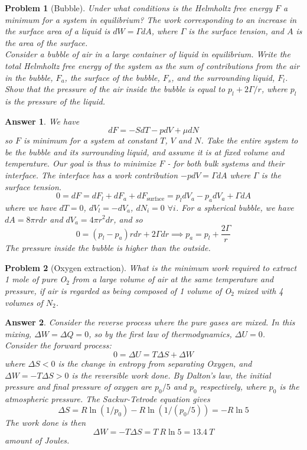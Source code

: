 \documentclass[a4paper]{article}
\newtheorem{ans}{Answer}[section]
\theoremstyle{new}
\newtheorem{qns}{Problem}[section]
\begin{document}
\newpage
\begin{qns}[Bubble]
Under what conditions is the Helmholtz free energy $F$ a minimum for a system in equilibrium? The work corresponding to an increase in the surface area of a liquid is $dW = \Gamma dA$, where $\Gamma$ is the surface tension, and $A$ is the area of the surface.\\[5pt]
Consider a bubble of air in a large container of liquid in equilibrium. Write the total Helmholtz free energy of the system as the sum of contributions from the air in the bubble, $F_a$, the surface of the bubble, $F_s$, and the surrounding liquid, $F_l$. Show that the pressure of the air inside the bubble is equal to $p_l + 2\Gamma/r$, where $p_l$ is the pressure of the liquid.
\end{qns}
\begin{ans}
We have
$$dF=-SdT-pdV+\mu dN$$
so $F$ is minimum for a system at constant $T$, $V$ and $N$. Take the entire system to be the bubble and its surrounding liquid, and assume it is at fixed volume and temperature. Our goal is thus to minimize $F$ - for both bulk systems and their interface. The interface has a work contribution $-pdV=\Gamma dA$ where $\Gamma$ is the surface tension.
$$0=dF=dF_l+dF_a+dF_{\text{surface}}=p_ldV_a-p_adV_a+\Gamma dA$$
where we have $dT=0$, $dV_l=-dV_a$, $dN_i=0$ $\forall i$. For a spherical bubble, we have $dA=8\pi rdr$ and $dV_a=4\pi r^2dr$, and so
$$0=(p_l-p_a)rdr+2\Gamma dr\implies p_a=p_l+\frac{2\Gamma}{r}$$
The pressure inside the bubble is higher than the outside.
\end{ans}
\begin{qns}[Oxygen extraction]
What is the minimum work required to extract 1 mole of pure O$_2$ from a large volume of air at the same temperature and pressure, if air is regarded as being composed of 1 volume of O$_2$ mixed with 4 volumes of $N_2$. 
\end{qns}
\begin{ans}
Consider the reverse process where the pure gases are mixed. In this mixing, $\Delta W=\Delta Q=0$, so by the first law of thermodynamics, $\Delta U=0$.\\[5pt]
Consider the forward process:
$$0=\Delta U=T\Delta S+\Delta W$$
where $\Delta S<0$ is the change in entropy from separating Oxygen, and $\Delta W=-T\Delta S>0$ is the reversible work done. By Dalton's law, the initial pressure and final pressure of oxygen are $p_0/5$ and $p_0$ respectively, where $p_0$ is the atmospheric pressure. The Sackur-Tetrode equation gives
$$\Delta S=R\ln(1/p_0)-R\ln(1/(p_0/5))=-R\ln 5$$
The work done is then
$$\Delta W=-T\Delta S=T~R\ln 5=13.4~T$$
amount of Joules.
\end{ans}
\end{document}
